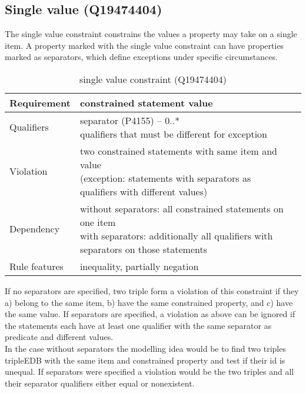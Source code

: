 \documentclass[hyperref,bachelorofscience]{cgvpub}
\begin{document}
\subsection{Single value (Q19474404)}
The single value constraint constrains the values a property may take on a single item. A property marked with the single value constraint can have properties marked as separators, which define exceptions under specific circumstances.
\begin{table}[H]
\caption{single value constraint (Q19474404)}
\begin{tabularx}{\textwidth}{ ll X}
\hline
Requirement & constrained statement value \\
\hline
Qualifiers & \makecell{separator (P4155) -- 0..* \\ qualifiers that must be different for exception} \\
\hline
Violation & \makecell{two constrained statements with same item and value \\ (exception: statements with separators as qualifiers with different values)} \\
\hline
Dependency & \makecell{without separators: all constrained statements on one item \\ with separators: additionally all qualifiers with separators on those statements }\\
\hline
Rule features & inequality, partially negation \\
\hline
\end{tabularx}
\end{table}

If no separators are specified, two triple form a violation of this constraint if they a) belong to the same item, b) have the same constrained property, and c) have the same value.
If separators are specified, a violation as above can be ignored if the statements each have at least one qualifier with the same separator as predicate and different values.\\
In the case without separators the modelling idea would be to find two triples tripleEDB with the same item and constrained property and test if their id is unequal. If separators were specified a violation would be the two triples and all their separator qualifiers either equal or nonexistent.
\end{document}
